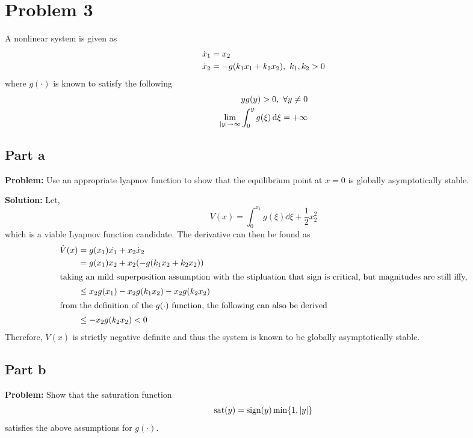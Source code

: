 \documentclass[letter]{article}
\begin{document}
\newpage
\section{Problem 3}
A nonlinear system is given as
\begin{equation}
	\begin{aligned}
		\dot{x}_1 &= x_2\\
		\dot{x}_2 &= -g \qty(k_1 x_1 + k_2 x_2), \ k_1, k_2 > 0
	\end{aligned}
\end{equation}
where $g(\cdot)$ is known to satisfy the following
\begin{equation}
	\begin{aligned}
		y g(y) > 0, \ \forall y \neq 0\\
		\lim_{\abs{y} \to \infty} \int_0^y g(\xi) \dd{\xi}  = + \infty
	\end{aligned}
\end{equation}

\subsection{Part a}
\textbf{Problem:}
Use an appropriate lyapnov function to show that the equilibrium point at $x=0$ is globally asymptotically stable.

\noindent
\textbf{Solution:}
Let,
\begin{equation}
	V(x) = \int_0^{x_1} g(\xi) \dd \xi + \frac{1}{2} x_2^2
\end{equation}
which is a viable Lyapnov function candidate. The derivative can then be found as
\begin{align}
	\dot{V}(x) &= g(x_1) \dot{x_1} + x_2 \dot{x}_2\\
	&= g(x_1) x_2 + x_2 (-g(k_1 x_2 + k_2 x_2))\\
	\intertext{taking an mild superposition assumption with the stipluation that sign is critical, but magnitudes are still iffy,}
	&\leq x_2 g(x_1) - x_2 g(k_1 x_2) - x_2 g(k_2 x_2)\\
	\intertext{from the definition of the $g(\cdot)$ function, the following can also be derived}
	&\leq - x_2 g(k_2 x_2) < 0
\end{align}
Therefore, $\dot{V}(x)$ is strictly negative definite and thus the system is known to be globally asymptotically stable.

\newpage
\subsection{Part b}
\textbf{Problem:}
Show that the saturation function $$\text{sat}(y) = \text{sign}(y) \min \{1, \abs{y}\}$$ satisfies the above assumptions for $g(\cdot)$.
\end{document}
